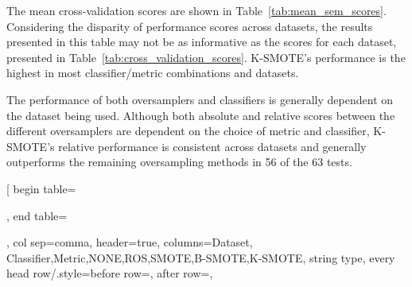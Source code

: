 \documentclass[remotesensing,article,submit,moreauthors,pdftex]{Definitions/mdpi}
\begin{document}
\begin{paracol}{2}
\linenumbers
\switchcolumn

The mean cross-validation scores are shown in Table~\ref{tab:mean_sem_scores}.
Considering the disparity of performance scores across datasets, the results
presented in this table may not be as informative as the scores for each
dataset, presented in Table~\ref{tab:cross_validation_scores}. K-SMOTE's
performance is the highest in most classifier/metric combinations and
datasets.

\end{paracol}
\begin{paracol}{2}
\linenumbers
\switchcolumn

The performance of both oversamplers and classifiers is generally dependent on
the dataset being used. Although both absolute and relative scores between the
different oversamplers are dependent on the choice of metric and classifier,
K-SMOTE's relative performance is consistent across datasets and generally
outperforms the remaining oversampling methods in 56 of the 63 tests.

\end{paracol}
\pgfplotstabletypeset[
	begin table=\begin{longtable},
		end table=\end{longtable},
	col sep=comma,
	header=true,
	columns={Dataset, Classifier,Metric,NONE,ROS,SMOTE,B-SMOTE,K-SMOTE}, 
    string type,
	every head row/.style={before row=\toprule, after row=\midrule\endhead},
\end{document}
